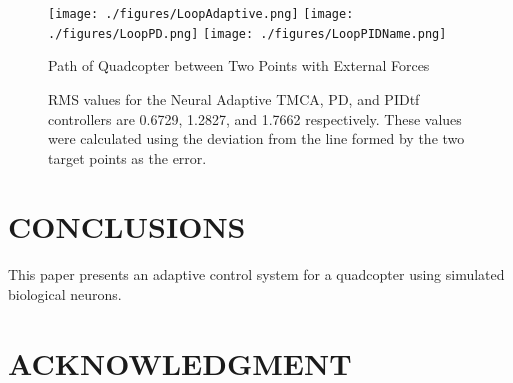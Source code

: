 \documentclass[letterpaper, 10 pt, conference]{ieeeconf}  %
\begin{document}
\begin{figure}
\centering
\texttt{[image: ./figures/LoopAdaptive.png]}
\texttt{[image: ./figures/LoopPD.png]}
\texttt{[image: ./figures/LoopPIDName.png]}
\caption{Path of Quadcopter between Two Points with External Forces} %
\label{fig:loop_path}
\captionsetup{singlelinecheck=off,font=footnotesize}
\caption*{
RMS values for the Neural Adaptive TMCA, PD, and PIDtf controllers are 0.6729, 1.2827, and 1.7662 respectively. These values were calculated using the deviation from the line formed by the two target points as the error.}
\end{figure}

\section{CONCLUSIONS}

This paper presents an adaptive control system for a quadcopter using simulated biological neurons.


\addtolength{\textheight}{-12cm}   %






\section*{ACKNOWLEDGMENT}








\nocite{*}
\end{document}
